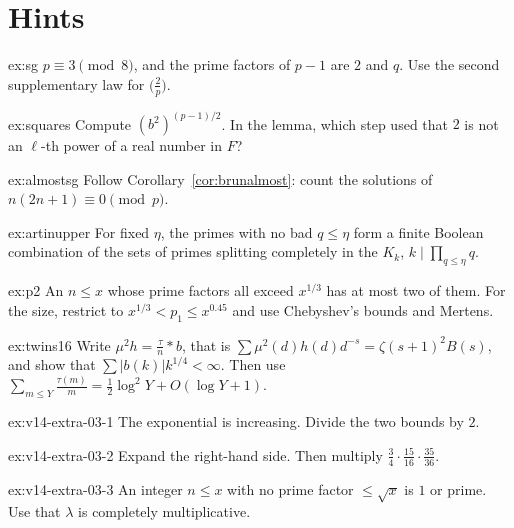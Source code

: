 \section{Hints}

\begin{hint}{ex:sg}
$p\equiv3\pmod8$, and the prime factors of $p-1$ are $2$ and $q$. Use the second supplementary law for $\bigl(\frac2p\bigr)$.
\end{hint}

\begin{hint}{ex:squares}
Compute $(b^2)^{(p-1)/2}$. In the lemma, which step used that $2$ is not an $\ell$-th power of a real number in $F$?
\end{hint}

\begin{hint}{ex:almostsg}
Follow Corollary~\ref{cor:brunalmost}: count the solutions of $n(2n+1)\equiv0\pmod p$.
\end{hint}

\begin{hint}{ex:artinupper}
For fixed $\eta$, the primes with no bad $q\le\eta$ form a finite Boolean combination of the sets of primes splitting completely in the $K_k$, $k\mid\prod_{q\le\eta}q$.
\end{hint}

\begin{hint}{ex:p2}
An $n\le x$ whose prime factors all exceed $x^{1/3}$ has at most two of them. For the size, restrict to $x^{1/3}<p_1\le x^{0.45}$ and use Chebyshev's bounds and Mertens.
\end{hint}

\begin{hint}{ex:twins16}
Write $\mu^2h=\frac\tau n*b$, that is $\sum\mu^2(d)h(d)d^{-s}=\zeta(s+1)^2B(s)$, and show that $\sum|b(k)|k^{1/4}<\infty$. Then use $\sum_{m\le Y}\frac{\tau(m)}m=\frac12\log^2Y+O(\log Y+1)$.
\end{hint}

\begin{hint}{ex:v14-extra-03-1}
The exponential is increasing. Divide the two bounds by $2$.
\end{hint}

\begin{hint}{ex:v14-extra-03-2}
Expand the right-hand side. Then multiply $\frac34\cdot\frac{15}{16}\cdot\frac{35}{36}$.
\end{hint}

\begin{hint}{ex:v14-extra-03-3}
An integer $n\le x$ with no prime factor $\le\sqrt x$ is $1$ or prime. Use that $\lambda$ is completely multiplicative.
\end{hint}


